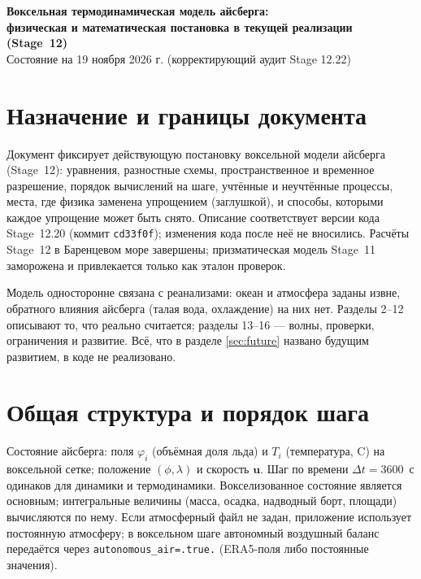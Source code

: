 \documentclass[12pt,a4paper]{article}
\newcommand{\code}[1]{\texttt{\small #1}}
\begin{document}
\begin{center}
{\fontsize{16}{20}\selectfont\bfseries Воксельная термодинамическая модель айсберга:\\ физическая и математическая постановка в текущей реализации (Stage~12)}\\[1ex]
Состояние на 19 ноября 2026 г. (корректирующий аудит Stage 12.22)
\end{center}

\tableofcontents
\newpage

\section{Назначение и границы документа}

Документ фиксирует действующую постановку воксельной модели айсберга (Stage~12): уравнения, разностные схемы, пространственное и временное разрешение, порядок вычислений на шаге, учтённые и неучтённые процессы, места, где физика заменена упрощением (заглушкой), и способы, которыми каждое упрощение может быть снято. Описание соответствует версии кода Stage~12.20 (коммит \code{cd33f0f}); изменения кода после неё не вносились. Расчёты Stage~12 в Баренцевом море завершены; призматическая модель Stage~11 заморожена и привлекается только как эталон проверок.

Модель односторонне связана с реанализами: океан и атмосфера заданы извне, обратного влияния айсберга (талая вода, охлаждение) на них нет. Разделы 2--12 описывают то, что реально считается; разделы 13--16 --- волны, проверки, ограничения и развитие. Всё, что в разделе \ref{sec:future} названо будущим развитием, в коде не реализовано.

\section{Общая структура и порядок шага}\label{sec:order}

Состояние айсберга: поля $\varphi_i$ (объёмная доля льда) и $T_i$ (температура, \textdegree C) на воксельной сетке; положение $(\phi,\lambda)$ и скорость $\mathbf u$. Шаг по времени $\Delta t=3600$~с одинаков для динамики и термодинамики. Вокселизованное состояние является основным; интегральные величины (масса, осадка, надводный борт, площади) вычисляются по нему. Если атмосферный файл не задан, приложение использует постоянную атмосферу; в воксельном шаге автономный воздушный баланс передаётся через \code{autonomous\_air=.true.} (ERA5-поля либо постоянные значения).
\end{document}
